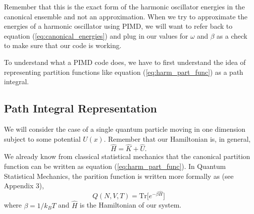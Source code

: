 \documentclass{article}
\newcommand{\be}{\begin{equation}}
\newcommand{\ee}{\end{equation}}
\begin{document}
Remember that this is the exact form of the harmonic oscillator energies in the canonical ensemble and not an approximation. When we try to approximate the energies of a harmonic oscillator using PIMD, we will want to refer back to equation (\ref{eq:canonical_energies}) and plug in our values for $\omega$ and $\beta$ as a check to make sure that our code is working.

To understand what a PIMD code does, we have to first understand the idea of representing partition functions like equation (\ref{eq:harm_part_func}) as a path integral.

\subsection{Path Integral Representation}
We will consider the case of a single quantum particle moving in one dimension subject to some potential $U(x)$.
Remember that our Hamiltonian is, in general,
\be
  \hat{H} = \hat{K} + \hat{U} .
\ee
We already know from classical statistical mechanics that the canonical partition function can be written as equation (\ref{eq:harm_part_func}).
In Quantum Statistical Mechanics, the parition function is written more formally as (see Appendix 3),
\be \label{eq:quan_part_func}
  Q(N, V, T) = \text{Tr}\Big[ e^{- \beta \hat{H}} \Big]
\ee
where $\beta = 1/k_BT$ and $\hat{H}$ is the Hamiltonian of our system.
\end{document}
